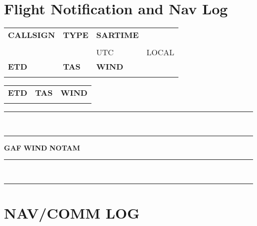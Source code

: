 \documentclass[a5paper,10pt]{article}
\newcommand{\boxheight}{0.5cm}
\newcommand{\boxwidthA}{2.5cm}
\newcommand{\boxwidthB}{3.5cm}
\newcommand{\inputbox}[2]{\fbox{\rule{0pt}{#1}\hspace{#2}}}
\newcommand{\checkbox}{\fbox{\rule{0pt}{0.3cm}\hspace{0.3cm}}}
\newcommand{\doubleline}{%
  \noindent\rule{\textwidth}{0.2pt}\\[-10pt]
  \noindent\rule{\textwidth}{0.2pt}%
}
\begin{document}
\small
\section*{Flight Notification and Nav Log}

\noindent
\begin{tabular}{p{3cm} p{3cm} p{3cm} p{3cm}}
    \textbf{CALLSIGN}                 & \textbf{TYPE}                     & \textbf{SARTIME}                  & ~                                 \\
    \inputbox{\boxheight}{\boxwidthA} & \inputbox{\boxheight}{\boxwidthA} & \inputbox{\boxheight}{\boxwidthA} & \inputbox{\boxheight}{\boxwidthA} \\
                                      &                                   & {\tiny UTC}                       & {\tiny LOCAL}                     \\
    \textbf{ETD}                      & \textbf{TAS}                      & \textbf{WIND}                     \\
    \inputbox{\boxheight}{\boxwidthA} & \inputbox{\boxheight}{\boxwidthA} & \inputbox{\boxheight}{\boxwidthA} \\
\end{tabular}

\vspace{0.1cm}

\noindent
\begin{tabular}{p{4cm} p{4cm} p{4cm}}
    \textbf{ETD}                      & \textbf{TAS}                      & \textbf{WIND}                     \\
    \inputbox{\boxheight}{\boxwidthB} & \inputbox{\boxheight}{\boxwidthB} & \inputbox{\boxheight}{\boxwidthB} \\
\end{tabular}

\vspace{0.3cm}

\doubleline
\vspace{0.3cm}
\begin{center}
    \textbf{GAF} \checkbox \hspace{1cm} \textbf{WIND} \checkbox \hspace{1cm} \textbf{NOTAM} \checkbox
\end{center}
\par
\doubleline

\section*{NAV/COMM LOG}
\end{document}
